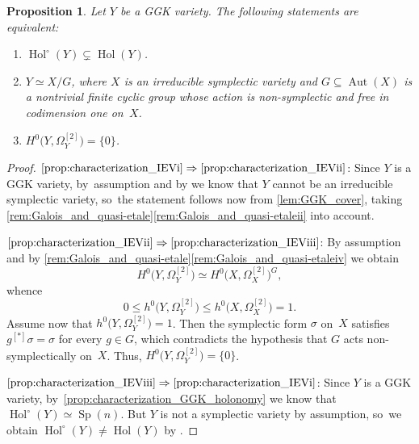 \documentclass[JEP,XML,SOM,Unicode,published]{cedram}
\theoremstyle{plain}
\newtheorem{prop}[thm]{Proposition}
\theoremstyle{definition}
\DeclareMathOperator{\Aut}{Aut}
\DeclareMathOperator{\Hol}{Hol}
\DeclareMathOperator{\Sp}{Sp}
\begin{document}
\begin{prop}
\label{prop:characterization_IEV}
Let $Y$ be a GGK variety. The following statements are equivalent:
\begin{enumerate}
\item\label{prop:characterization_IEVi}
$\Hol^\circ(Y) \subsetneq \Hol(Y) $.

\item\label{prop:characterization_IEVii}
$Y \simeq X/G$, where $X$ is an irreducible symplectic variety and $G \subseteq \Aut(X)$ is a nontrivial finite cyclic group whose action is non-symplectic and free in codimension one on~$X$.

\item\label{prop:characterization_IEViii}
$ H^0 \bigl(Y,\Omega_Y^{[2]} \bigr) = \{ 0 \}$.
\end{enumerate}
\end{prop}

\skpt
\begin{proof}

$\eqref{prop:characterization_IEVi}\Rightarrow\eqref{prop:characterization_IEVii}$: Since $Y$ is a GGK variety, by~assumption and by \cite[Prop.\,F, (F.4)--(F.6)]{GGK19} we know that $Y$ cannot be an irreducible symplectic variety, so~the statement follows now from \autoref{lem:GGK_cover}, taking \autoref{rem:Galois_and_quasi-etale}\eqref{rem:Galois_and_quasi-etaleii} into account.

$\eqref{prop:characterization_IEVii}\Rightarrow\eqref{prop:characterization_IEViii}$: By assumption and by \autoref{rem:Galois_and_quasi-etale}\eqref{rem:Galois_and_quasi-etaleiv} we obtain
\[
H^0 \bigl(Y,\Omega_Y^{[2]} \bigr) \simeq H^0 \bigl(X,\Omega_X^{[2]} \bigr)^G,
\]
whence
\[
0 \leq h^0 \bigl(Y,\Omega_Y^{[2]} \bigr) \leq h^0 \bigl(X,\Omega_X^{[2]} \bigr) = 1.
\]
Assume now that $h^0 \bigl(Y,\Omega_Y^{[2]} \bigr) = 1$. Then the symplectic form $\sigma$ on~$X$ satisfies $g^{[*]} \sigma = \sigma$ for every $g \in G$, which contradicts the hypothesis that $G$ acts non-symplectically on~$X$. Thus,
$ H^0 \bigl(Y,\Omega_Y^{[2]} \bigr) = \{ 0 \} $.

$\eqref{prop:characterization_IEViii}\Rightarrow\eqref{prop:characterization_IEVi}$: Since $Y$ is a GGK variety, by~\autoref{prop:characterization_GGK_holonomy} we know that $\Hol^\circ(Y) \simeq \Sp(n)$. But $Y$ is not a symplectic variety by assumption, so~we obtain $\Hol^\circ(Y) \neq \Hol(Y)$ by \cite[Prop.\,F, (F.4)--(F.6)]{GGK19}.
\end{proof}
\end{document}
